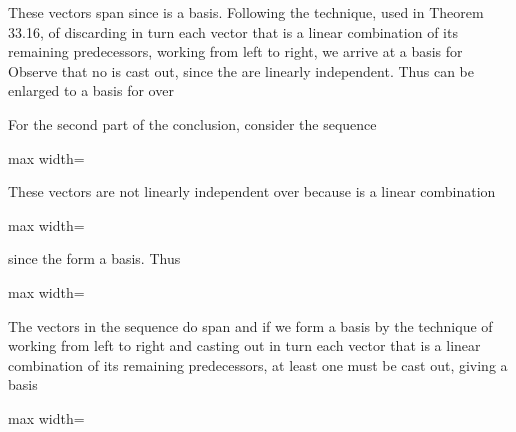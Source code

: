\documentclass[11pt,oneside]{article}
\begin{document}
\begin{BookBody}

\noindent These vectors span  since  is a basis. Following the technique, used in Theorem 33.16, of discarding in turn each vector that is a linear combination of its remaining predecessors, working from left to right, we arrive at a basis for  Observe that no  is cast out, since the  are linearly independent. Thus  can be enlarged to a basis for  over 

For the second part of the conclusion, consider the sequence

\begin{center}\begin{adjustbox}{max width=\linewidth}\end{adjustbox}\end{center}

\noindent These vectors are not linearly independent over  because  is a linear combination

\begin{center}\begin{adjustbox}{max width=\linewidth}\end{adjustbox}\end{center}

\noindent since the  form a basis. Thus

\begin{center}\begin{adjustbox}{max width=\linewidth}\end{adjustbox}\end{center}

\noindent The vectors in the sequence do span  and if we form a basis by the technique of working from left to right and casting out in turn each vector that is a linear combination of its remaining predecessors, at least one  must be cast out, giving a basis

\begin{center}\begin{adjustbox}{max width=\linewidth}\end{adjustbox}\end{center}


\end{BookBody}
\end{document}
